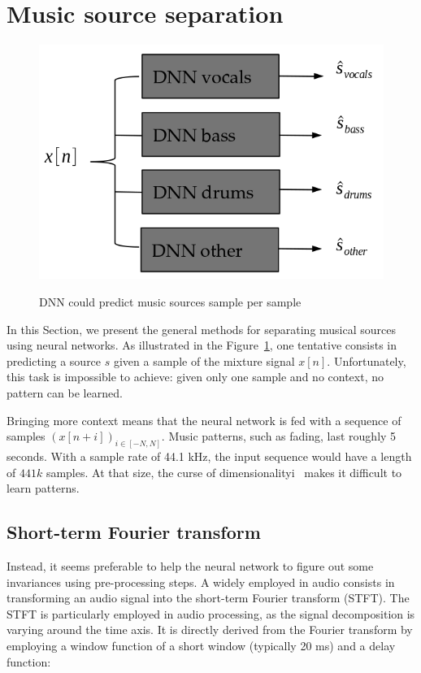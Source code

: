\section{Music source separation}
\label{sec:background}

\begin{figure}
  \centering
  \includegraphics[width=0.5\columnwidth]{mss-basic.png}
  \label{fig:mss-basic}
  \caption{DNN could predict music sources sample per sample}
\end{figure}

In this Section, we present the general methods for separating musical
sources using neural networks.
As illustrated in the Figure~\ref{fig:mss-basic}, one tentative consists
in predicting a source $\hat{s}$ given a sample of the mixture signal $x[n]$.
Unfortunately, this task is impossible to achieve:
given only one sample and no context, no pattern can be learned.

Bringing more context means that the neural network is fed
 with a sequence of samples $(x[n+i])_{i\in [-N, N]}$.
Music patterns, such as fading, last roughly 5 seconds.
 With a sample rate of 44.1 kHz, the input sequence would have a length of $441k$ samples.
At that size, the curse of dimensionalityi~\cite{mallat} makes it difficult to learn patterns.



\subsection{Short-term Fourier transform}

Instead, it seems preferable to help the neural network to
figure out some invariances using pre-processing steps.
A widely employed in audio consists in transforming an audio signal
into the short-term Fourier transform (STFT).
The STFT is particularly employed in audio processing, as the signal decomposition is varying around the time axis.
It is directly derived from the Fourier transform by employing a window function of a short window (typically 20 ms)
and a delay function:


